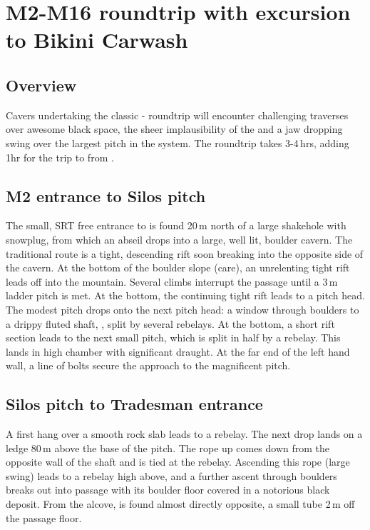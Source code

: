 \section{M2-M16 roundtrip with excursion to Bikini Carwash}
\subsection{Overview}
Cavers undertaking the classic - roundtrip will encounter challenging traverses over awesome black space, the sheer implausibility of the  and a jaw dropping swing over the largest pitch in the system. The roundtrip takes 3-4\,hrs, adding 1hr for the trip to  from . 

\subsection{M2 entrance to Silos pitch}
The small, SRT free entrance to  is found 20\,m north of a large shakehole with snowplug, from which an abseil drops into a large, well lit, boulder cavern. The traditional route is a tight, descending rift soon breaking into the opposite side of the cavern. At the bottom of the boulder slope (care), an unrelenting tight rift leads off into the mountain. Several climbs interrupt the passage until a 3\,m ladder pitch is met. At the bottom, the continuing tight rift leads to a pitch head. The modest pitch drops onto the next pitch head: a window through boulders to a drippy fluted shaft, , split by several rebelays. At the bottom, a short rift section leads to the next small pitch, which is split in half by a rebelay. This lands in high chamber with significant draught. At the far end of the left hand wall, a line of bolts secure the approach to the magnificent  pitch. 

\subsection{Silos pitch to Tradesman entrance}
A first hang over a smooth rock slab leads to a rebelay. The next drop lands on a ledge 80\,m above the base of the pitch. The rope up  comes down from the opposite wall of the shaft and is tied at the rebelay. Ascending this rope (large swing) leads to a rebelay high above, and a further ascent through boulders breaks out into  passage with its boulder floor covered in a notorious black deposit. From the  alcove,  is found almost directly opposite, a small tube 2\,m off the passage floor. 

